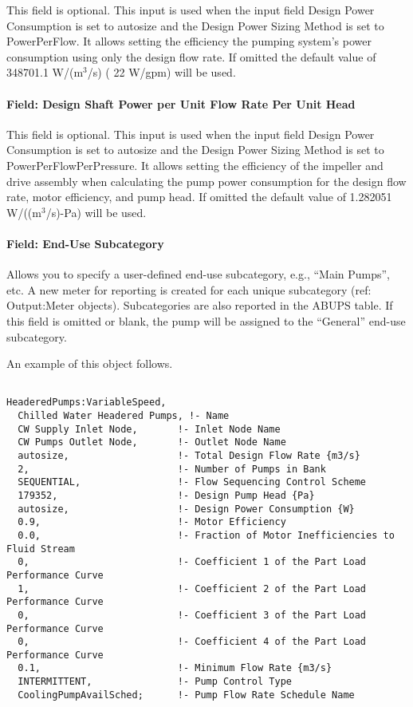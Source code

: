 This field is optional. This input is used when the input field Design Power Consumption is set to autosize and the Design Power Sizing Method is set to PowerPerFlow. It allows setting the efficiency the pumping system's power consumption using only the design flow rate. If omitted the default value of 348701.1 W/(m\(^{3}\)/s) ( 22 W/gpm) will be used.

\paragraph{Field: Design Shaft Power per Unit Flow Rate Per Unit Head}\label{field-design-shaft-power-per-unit-flow-rate-per-unit-head-4}

This field is optional. This input is used when the input field Design Power Consumption is set to autosize and the Design Power Sizing Method is set to PowerPerFlowPerPressure. It allows setting the efficiency of the impeller and drive assembly when calculating the pump power consumption for the design flow rate, motor efficiency, and pump head. If omitted the default value of 1.282051 W/((m\(^{3}\)/s)-Pa) will be used.

\paragraph{Field: End-Use Subcategory}

Allows you to specify a user-defined end-use subcategory, e.g., ``Main Pumps'', etc. A new meter for reporting is created for each unique subcategory (ref: Output:Meter objects). Subcategories are also reported in the ABUPS table. If this field is omitted or blank, the pump will be assigned to the ``General'' end-use subcategory.

An example of this object follows.

\begin{lstlisting}

HeaderedPumps:VariableSpeed,
  Chilled Water Headered Pumps, !- Name
  CW Supply Inlet Node,       !- Inlet Node Name
  CW Pumps Outlet Node,       !- Outlet Node Name
  autosize,                   !- Total Design Flow Rate {m3/s}
  2,                          !- Number of Pumps in Bank
  SEQUENTIAL,                 !- Flow Sequencing Control Scheme
  179352,                     !- Design Pump Head {Pa}
  autosize,                   !- Design Power Consumption {W}
  0.9,                        !- Motor Efficiency
  0.0,                        !- Fraction of Motor Inefficiencies to Fluid Stream
  0,                          !- Coefficient 1 of the Part Load Performance Curve
  1,                          !- Coefficient 2 of the Part Load Performance Curve
  0,                          !- Coefficient 3 of the Part Load Performance Curve
  0,                          !- Coefficient 4 of the Part Load Performance Curve
  0.1,                        !- Minimum Flow Rate {m3/s}
  INTERMITTENT,               !- Pump Control Type
  CoolingPumpAvailSched;      !- Pump Flow Rate Schedule Name
\end{lstlisting}

